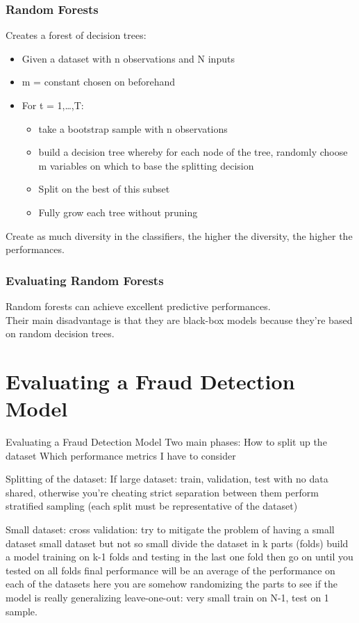         \subsubsection{Random Forests}
            Creates a forest of decision trees:
            \begin{itemize}
                \item Given a dataset with n observations and N inputs 
                \item m = constant chosen on beforehand 
                \item For t = 1,\dots,T:
                \begin{itemize}
                    \item take a bootstrap sample with n observations 
                    \item build a decision tree whereby for each node of the tree, randomly choose m variables on which to base the splitting decision
                    \item Split on the best of this subset 
                    \item Fully grow each tree without pruning
                \end{itemize}
            \end{itemize}
            Create as much diversity in the classifiers, the higher the diversity, the higher the performances.
        \subsubsection{Evaluating Random Forests}
            Random forests can achieve excellent predictive performances.\\
            Their main disadvantage is that they are black-box models because they're based on random decision trees.
\section{Evaluating a Fraud Detection Model}
\iffalse
Evaluating a Fraud Detection Model
    Two main phases:
        How to split up the dataset 
        Which performance metrics I have to consider 
    
    Splitting of the dataset:
        If large dataset: train, validation, test with no data shared, otherwise you're cheating
            strict separation between them 
            perform stratified sampling (each split must be representative of the dataset)
        
        Small dataset:
            cross validation: try to mitigate the problem of having a small dataset 
                small dataset but not so small 
                divide the dataset in k parts (folds)
                build a model training on k-1 folds and testing in the last one fold 
                then go on until you tested on all folds 
                final performance will be an average of the performance on each of the datasets 
                here you are somehow randomizing the parts to see if the model is really generalizing
            leave-one-out: very small
                train on N-1, test on 1 sample.
            
